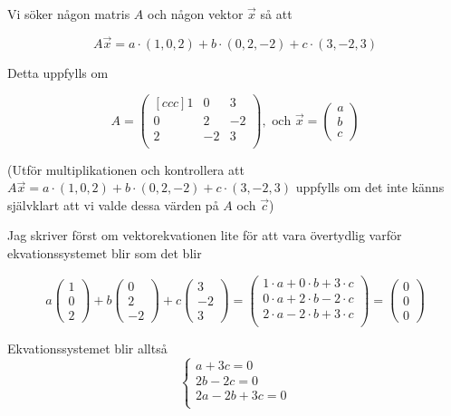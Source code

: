 \documentclass[../../main.tex]{subfiles}
\begin{document}
\begin{solution}{6}

Vi söker någon matris $A$ och någon vektor $\Vec{x}$ så att

$$A\Vec{x}=a\cdot(1, 0, 2) + b\cdot(0, 2, -2) + c\cdot(3, -2, 3)$$

Detta uppfylls om

$$
A = \begin{pmatrix}[ccc]
1 & 0 & 3 \\
0 & 2 & -2\\
2 & -2 & 3\\
\end{pmatrix}, \text{ och } \Vec{x} = 
\begin{pmatrix}
a\\b\\c
\end{pmatrix}
$$

(Utför multiplikationen och kontrollera att  $A\Vec{x}=a\cdot(1, 0, 2) + b\cdot(0, 2, -2) + c\cdot(3, -2, 3)$ uppfylls om det inte känns självklart att vi valde dessa värden på $A$ och $\Vec{c}$)

Jag skriver först om vektorekvationen lite för att vara övertydlig varför ekvationssystemet blir som det blir

$$
a\begin{pmatrix}
1\\0\\2
\end{pmatrix} + b \begin{pmatrix}
0\\2\\-2
\end{pmatrix} + c \begin{pmatrix}
3\\-2\\3
\end{pmatrix} = \begin{pmatrix}
1\cdot a + 0\cdot b + 3\cdot c\\
0\cdot a + 2\cdot b - 2\cdot c\\
2\cdot a - 2\cdot b + 3\cdot c\\
\end{pmatrix} = \begin{pmatrix}
0\\0\\0
\end{pmatrix}
$$

Ekvationssystemet blir alltså 
$$\begin{cases}
a + 3c = 0\\
2b - 2c = 0\\
2a - 2b + 3c = 0\\
\end{cases}$$


\end{solution}
\end{document}
